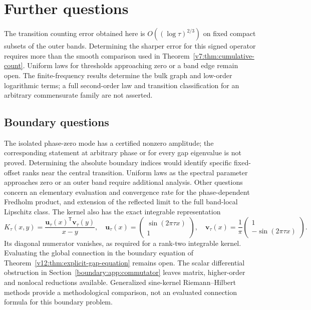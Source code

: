 \section{Further questions}
The transition counting error obtained here is
$O((\log\tau)^{2/3})$ on fixed compact subsets of the outer bands.
Determining the sharper error for this signed operator requires more than
the smooth comparison used in Theorem~\ref{v7:thm:cumulative-count}.
Uniform laws for thresholds approaching zero or a band edge remain open.
The finite-frequency results determine the bulk graph and low-order
logarithmic terms; a full second-order law and transition classification
for an arbitrary commensurate family are not asserted.

\subsection{Boundary questions}
The isolated phase-zero mode has a certified nonzero amplitude; the
corresponding statement at arbitrary phase or for every gap eigenvalue
is not proved. Determining the absolute boundary indices would identify
specific fixed-offset ranks near the central transition. Uniform laws
as the spectral parameter approaches zero or an outer band require
additional analysis.
Other questions concern an elementary evaluation and convergence rate
for the phase-dependent Fredholm product, and extension of the
reflected limit to the full band-local Lipschitz class.
The kernel also has the exact integrable representation
\[
 K_\tau(x,y)=\frac{\mathbf u_\tau(x)^{\mathsf T}\mathbf v_\tau(y)}{x-y},
 \quad
 \mathbf u_\tau(x)=\begin{pmatrix}\sin(2\pi\tau x)\\1\end{pmatrix},
 \quad
 \mathbf v_\tau(x)=\frac1\pi\begin{pmatrix}1\\-\sin(2\pi\tau x)\end{pmatrix}.
\]
Its diagonal numerator vanishes, as required for a rank-two integrable
kernel. Evaluating the global connection in the boundary equation
of Theorem~\ref{v12:thm:explicit-gap-equation} remains open.
The scalar differential obstruction in
Section~\ref{boundary:app:commutator} leaves matrix, higher-order
and nonlocal reductions available. Generalized sine-kernel
Riemann--Hilbert methods \cite{KitanineEtAl2009} provide a methodological
comparison, not an evaluated connection formula for this boundary problem.



